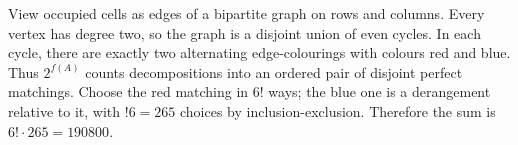 View occupied cells as edges of a bipartite graph on rows and columns. Every vertex has degree two, so the graph is a disjoint union of even cycles. In each cycle, there are exactly two alternating edge-colourings with colours red and blue. Thus $2^{f(A)}$ counts decompositions into an ordered pair of disjoint perfect matchings. Choose the red matching in $6!$ ways; the blue one is a derangement relative to it, with $!6=265$ choices by inclusion-exclusion. Therefore the sum is $\boxed{6!\cdot265=190800}$.
